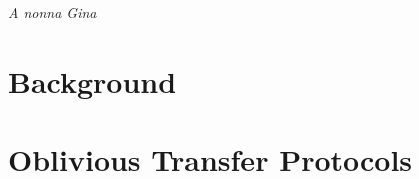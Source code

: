 \documentclass[a4paper,11pt,twoside,openright]{memoir}
\theoremstyle{definition}
\theoremstyle{remark}
\begin{document}
\pagestyle{ruled}



\frontmatter


\thispagestyle{empty}
\null{}
\begin{flushright}
    \textit{A nonna Gina}
\end{flushright}
\null

\cleardoublepage


\tableofcontents


\mainmatter

\part{Background}



\part{Oblivious Transfer Protocols}




\backmatter

%



\end{document}
